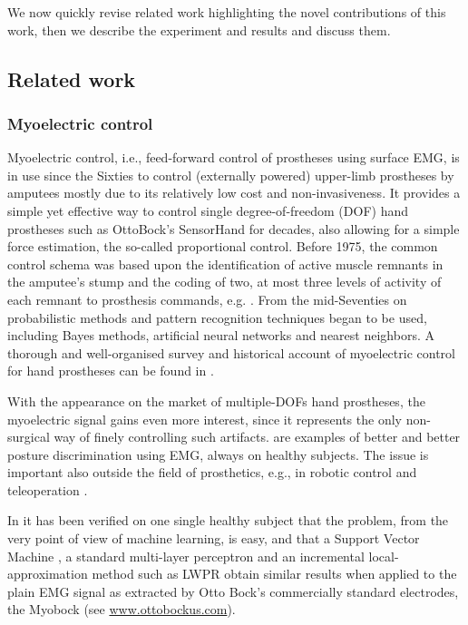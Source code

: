 We now quickly revise related work highlighting the novel contributions of this
work, then we describe the experiment and results and discuss them.

\subsection{Related work}

\subsubsection{Myoelectric control}

Myoelectric control, i.e., feed-forward control of prostheses using surface EMG,
is in use since the Sixties to control (externally powered) upper-limb prostheses
by amputees mostly due to its relatively low cost and non-invasiveness. It
provides a simple yet effective way to control single degree-of-freedom (DOF) hand
prostheses such as OttoBock's SensorHand for decades, also allowing for a simple
force estimation, the so-called proportional control. Before 1975, the common
control schema was based upon the identification of active muscle remnants in the
amputee's stump and the coding of two, at most three levels of activity of each
remnant to prosthesis commands, e.g. \cite{bottomley65,childress69}. From the mid-Seventies
on probabilistic methods and pattern recognition techniques began to be used,
including Bayes methods, artificial neural networks and nearest neighbors. 
A thorough and well-organised survey and historical account of myoelectric
control for hand prostheses can be found in \cite{englehart06}.

With the appearance on the market of multiple-DOFs hand prostheses, the myoelectric
signal gains even more interest, since it represents the only non-surgical
way of finely controlling such artifacts. \cite{englehart01,dunlop,smagt06} are
examples of better and better posture discrimination using EMG, always on healthy
subjects. The issue is important also outside the field of prosthetics, e.g., in
robotic control and teleoperation \cite{fukuda,yokoi}.

In \cite{2008.ICRA,2008.BioCyb} it has been verified on one single healthy subject
that the problem, from the very point of view of machine learning,
is easy, and that a Support Vector Machine \cite{BGV92},
a standard multi-layer perceptron and an incremental local-approximation
method such as LWPR \cite{lwpr} obtain similar results when applied to the plain EMG
signal as extracted by Otto Bock's commercially standard electrodes, the Myobock
(see \url{www.ottobockus.com}).

